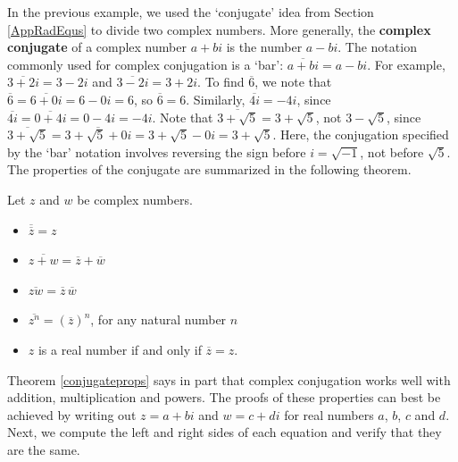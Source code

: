 \documentclass{ximera}
\begin{document}
In the previous example, we used the `conjugate' idea from Section \ref{AppRadEqus} to divide two complex numbers.  More generally, the \textbf{complex conjugate} of a complex number $a+bi$ is the number $a-bi$.  The notation commonly used for complex conjugation is a `bar':  $\overline{a+bi} = a-bi$. For example, $\overline{3+2i} = 3-2i$ and $\overline{3-2i} = 3+2i$. To find $\overline{6}$, we note that $\overline{6} = \overline{6+0i}= 6 - 0i = 6$, so $\overline{6} = 6$. Similarly, $\overline{4i} = -4i$, since $\overline{4i} = \overline{0 + 4i} = 0 - 4i =  -4i$.  Note that $\overline{3+\sqrt{5}} = 3 + \sqrt{5}$, not $3 - \sqrt{5}$, since  $\overline{3+\sqrt{5}} = \overline{3+\sqrt{5} + 0i} = 3+\sqrt{5}  - 0i = 3+\sqrt{5}$. Here, the conjugation specified by the `bar' notation involves reversing the sign before $i = \sqrt{-1}$, not before  $\sqrt{5}$.  The properties of the conjugate are summarized in the following theorem.

 


\begin{theorem}  \label{conjugateprops} Let $z$ and $w$ be complex numbers. 

\begin{itemize}

\item  $\overline{\overline{z}} = z$

\item  $ \overline{z+w} = \overline{z} + \overline{w}$

\item  $ \overline{zw} = \overline{z} \, \overline{w}$

\item  $\overline{z^{n}} = \left(\overline{z}\right)^n$, for any natural number $n$

\item  $z$ is a real number if and only if $\overline{z} = z$.

\end{itemize}

\end{theorem}

 

Theorem \ref{conjugateprops} says in part that complex conjugation works well with addition, multiplication and powers.  The proofs of these properties can best be achieved by writing out $z = a+bi$ and $w = c+di$ for real numbers $a$, $b$, $c$ and $d$.   Next, we compute the left and right sides of each equation and verify that they are the same.  
\end{document}
